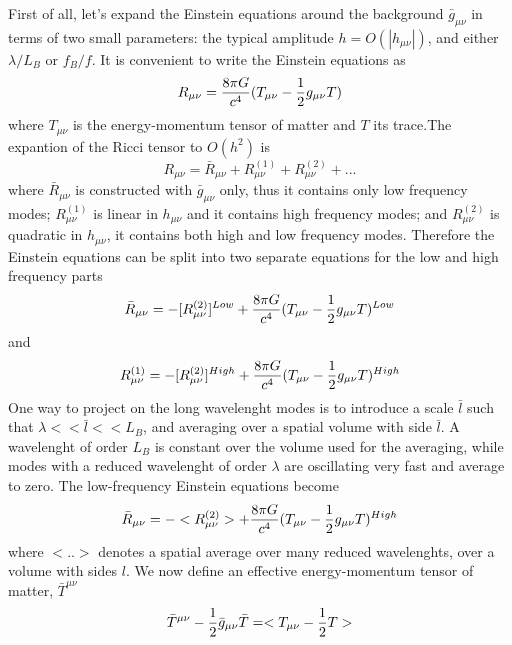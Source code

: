 \documentclass[binding=0.6cm, LaM]{sapthesis}
\begin{document}
First of all, let's expand the Einstein equations around the background $\bar g_{\mu \nu}$ in terms of two small parameters: the typical amplitude $h= O(|h_{\mu\nu}|)$, and either $\lambda/L_B$ or $f_B/f$. 
It is convenient to write the Einstein equations as 
\begin{equation}
R_{\mu\nu} = {{8\pi G}\over c^4}(T_{\mu\nu}- {1 \over 2}g_{\mu\nu}T) 
\end{equation}
where $T_{\mu\nu}$ is the energy-momentum tensor of matter and $T$ its trace.The expantion of the Ricci tensor to $O(h^2)$ is
\begin{equation}
R_{\mu\nu} = {\bar R_{\mu\nu}} + R_{\mu\nu}^{(1)} + R_{\mu\nu}^{(2)} + ...
\end{equation}
where $ {\bar R_{\mu\nu}}$ is constructed with $\bar g_{\mu\nu}$ only, thus it contains only low frequency modes;
$R_{\mu\nu}^{(1)}$ is linear in $h_{\mu\nu}$ and it contains high frequency modes;
and $R_{\mu\nu}^{(2)} $ is quadratic in $h_{\mu\nu}$, it contains both high and low frequency modes.
Therefore the Einstein equations can be split into two separate equations for the low and high frequency parts
\begin{equation}
{\bar R_{\mu\nu}} = -[R_{\mu\nu}^{(2)}]^{Low} + {{8\pi G}\over c^4}(T_{\mu\nu}- {1 \over 2}g_{\mu\nu}T) ^{Low}
\end{equation}
and
\begin{equation}
 R_{\mu\nu}^{(1)} = - [R_{\mu\nu}^{(2)}]^{High} +  {{8\pi G}\over c^4}(T_{\mu\nu}- {1 \over 2}g_{\mu\nu}T)^{High}
\end{equation}
One way to project on the long wavelenght modes is to introduce a scale $\bar l$ such that $\lambda << \bar l << L_B$, and averaging over a spatial volume with side $\bar l$.
A wavelenght of order $L_B$ is constant over the volume used for the averaging, while modes with a reduced wavelenght of order $\lambda$ are oscillating very fast and average to zero. 
The low-frequency Einstein equations become
\begin{equation}
 {\bar R_{\mu\nu}} = - <R_{\mu\nu}^{(2)}> +  {{8\pi G}\over c^4}(T_{\mu\nu}- {1 \over 2}g_{\mu\nu}T) ^{High}
\end{equation}
where $<..>$ denotes a spatial average over many reduced wavelenghts, over a volume with sides $l$.
We now define an effective energy-momentum tensor of matter, $\bar T^{\mu\nu}$ 
\begin{equation}
{\bar T^{\mu\nu}} - {1 \over 2}{\bar g_{\mu\nu}}{\bar T} = <T_{\mu\nu}- {1 \over 2}T>
\end{equation}
\end{document}

